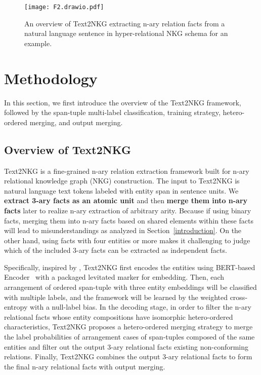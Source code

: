 \documentclass{article} \usepackage{iclr2024_conference,times}
\begin{document}
\begin{figure*}[t]
\centering
\texttt{[image: F2.drawio.pdf]}
\caption{An overview of Text2NKG extracting n-ary relation facts from a natural language sentence in hyper-relational NKG schema for an example. }
\label{f2}
\end{figure*}


\section{Methodology}
In this section, we first introduce the overview of the Text2NKG framework, followed by the span-tuple multi-label classification, training strategy, hetero-ordered merging, and output merging.

\subsection{Overview of Text2NKG}
Text2NKG is a fine-grained n-ary relation extraction framework built for n-ary relational knowledge graph (NKG) construction. The input to Text2NKG is natural language text tokens labeled with entity span in sentence units. We \textbf{extract 3-ary facts as an atomic unit} and then \textbf{merge them into n-ary facts} later to realize n-ary extraction of arbitrary arity. Because if using binary facts, merging them into n-ary facts based on shared elements within these facts will lead to misunderstandings as analyzed in Section~\ref{introduction}. On the other hand, using facts with four entities or more makes it challenging to judge which of the included 3-ary facts can be extracted as independent facts.

Specifically, inspired by \cite{PL-Marker}, Text2NKG first encodes the entities using BERT-based Encoder~\citep{Bert} with a packaged levitated marker for embedding. Then, each arrangement of ordered span-tuple with three entity embeddings will be classified with multiple labels, and the framework will be learned by the weighted cross-entropy with a null-label bias. In the decoding stage, in order to filter the n-ary relational facts whose entity compositions have isomorphic hetero-ordered characteristics, Text2NKG proposes a hetero-ordered merging strategy to merge the label probabilities of  arrangement cases of span-tuples composed of the same entities and filter out the output 3-ary relational facts existing non-conforming relations. Finally, Text2NKG combines the output 3-ary relational facts to form the final n-ary relational facts with output merging.
\end{document}
